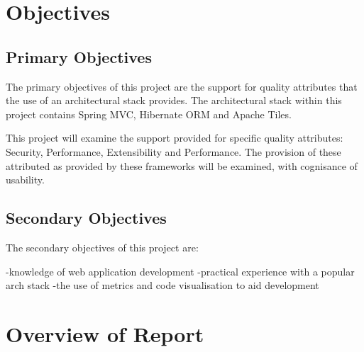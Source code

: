 \section{Objectives}

\subsection{Primary Objectives}

The primary objectives of this project are the support for quality attributes that the use of an architectural stack provides. The architectural stack within this project contains Spring MVC, Hibernate ORM and Apache Tiles. 

This project will examine the support provided for specific quality attributes: Security, Performance, Extensibility and Performance. The provision of these attributed as provided by these frameworks will be examined, with cognisance of usability. 

\subsection{Secondary Objectives}

The secondary objectives of this project are: 

-knowledge of web application development
-practical experience with a popular arch stack
-the use of metrics and code visualisation to aid development

\section{Overview of Report}
